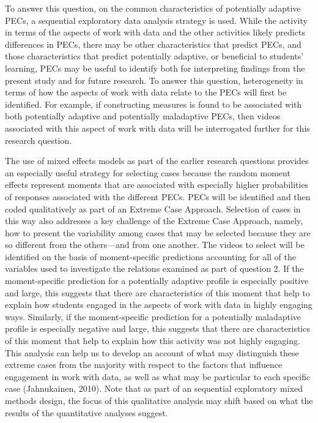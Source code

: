 \documentclass[]{book}
\theoremstyle{definition}
\theoremstyle{definition}
\theoremstyle{definition}
\theoremstyle{remark}
\begin{document}
To answer this question, on the common characteristics of potentially
adaptive PECs, a sequential exploratory data analysis strategy is used.
While the activity in terms of the aspects of work with data and the
other activities likely predicts differences in PECs, there may be other
characteristics that predict PECs, and those characteristics that
predict potentially adaptive, or beneficial to students' learning, PECs
may be useful to identify both for interpreting findings from the
present study and for future research. To answer this question,
heterogeneity in terms of how the aspects of work with data relate to
the PECs will first be identified. For example, if constructing measures
is found to be associated with both potentially adaptive and potentially
maladaptive PECs, then videos associated with this aspect of work with
data will be interrogated further for this research question.

The use of mixed effects models as part of the earlier research
questions provides an especially useful strategy for selecting cases
because the random moment effects represent moments that are associated
with especially higher probabilities of responses associated with the
different PECs. PECs will be identified and then coded qualitatively as
part of an Extreme Case Approach. Selection of cases in this way also
addresses a key challenge of the Extreme Case Approach, namely, how to
present the variability among cases that may be selected because they
are so different from the others---and from one another. The videos to
select will be identified on the basis of moment-specific predictions
accounting for all of the variables used to investigate the relations
examined as part of question 2. If the moment-specific prediction for a
potentially adaptive profile is especially positive and large, this
suggests that there are characteristics of this moment that help to
explain how students engaged in the aspects of work with data in highly
engaging ways. Similarly, if the moment-specific prediction for a
potentially maladaptive profile is especially negative and large, this
suggests that there are characteristics of this moment that help to
explain how this activity was not highly engaging. This analysis can
help us to develop an account of what may distinguish these extreme
cases from the majority with respect to the factors that influence
engagement in work with data, as well as what may be particular to each
specific case (Jahnukainen, 2010). Note that as part of an sequential
exploratory mixed methods design, the focus of this qualitative analysis
may shift based on what the results of the quantitative analyses
suggest.
\end{document}
